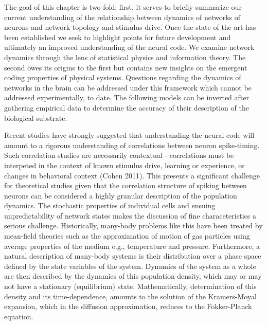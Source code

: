 \documentclass{ucetd}
\begin{document}
The goal of this chapter is two-fold: first, it serves to briefly summarize our current understanding of the relationship between dynamics of networks of neurons and network topology and stimulus drive. Once the state of the art has been established we seek to highlight points for future development and ultimately an improved understanding of the neural code. We examine network dynamics through the lens of statistical physics and information theory. The second owes its origins to the first but contains new insights on the emergent coding properties of physical systems. Questions regarding the dynamics of networks in the brain can be addressed under this framework which cannot be addressed experimentally, to date. The following models can be inverted after gathering empirical data to determine the accuracy of their description of the biological substrate.

Recent studies have strongly suggested that understanding the neural code will amount to a rigorous understanding of correlations between neuron spike-timing. Such correlation studies are necessarily contextual - correlations must be interpeted in the context of known stimulus drive, learning or experience, or changes in behavioral context (Cohen 2011). This presents a significant challenge for theoretical studies given that the correlation structure of spiking between neurons can be considered a highly granular description of the population dynamics. The stochastic properties of individual cells and ensuing unpredictability of network states makes the discussion of fine characeteristics a serious challenge. Historically, many-body problems like this have been treated by mean-field theories such as the approximation of motion of gas particles using average properties of the medium e.g., temperature and pressure. Furthermore, a natural description of many-body systems is their distribution over a phase space defined by the state variables of the system. Dynamics of the system as a whole are then described by the dynamics of this population density, which may or may not have a stationary (equilibrium) state. Mathematically, determination of this density and its time-dependence, amounts to the solution of the Kramers-Moyal expansion, which in the diffusion approximation, reduces to the Fokker-Planck equation.
\end{document}
